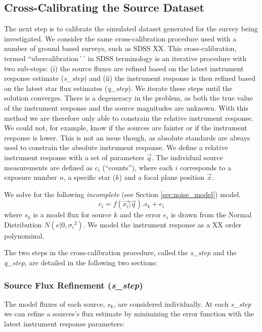\documentclass[manuscript]{aastex}
\begin{document}
\subsection{Cross-Calibrating the Source Dataset}
The next step is to calibrate the simulated dataset generated for the survey being investigated. We consider the same cross-calibration procedure used with a number of ground based surveys, such as SDSS XX. This cross-calibration, termed ``ubercalibration´´ in SDSS terminology is an iterative procedure with two sub-steps: (i) the source fluxes are refined based on the latest instrument response estimate (\textit{s\_step}) and (ii) the instrument response is then refined based on the latest star flux estimates (\textit{q\_step}). We iterate these steps until the solution converges. There is a degeneracy in the problem, as both the true value of the instrument response and the source magnitudes are unknown. With this method we are therefore only able to constrain the relative instrument response. We could not, for example, know if the sources are fainter or if the instrument response is lower. This is not an issue though, as absolute standards are always used to constrain the absolute instrument response. We define a relative instrument response with a set of parameters $\vec{q}$. The individual source measurements are defined as $c_i$ (``counts''), where each $i$ corresponds to a exposure number $n$, a specific star ($k$) and a focal plane position $\vec{x}$.

\noindent{}We solve for the following \textit{incomplete} (see Section \ref{sec:noise_model}) model.
\begin{displaymath}
c_i = f(\vec{x_i} | \vec{q}) . s_{k} + e_{i}
\end{displaymath}
where $s_k$ is a model flux for source $k$ and the error $e_i$ is drawn from the Normal Distribution $N(e|0,{\sigma_i}^2)$. We model the instrument response as a XX order polynominal. 

\noindent{}The two steps in the cross-calibration procedure, called the \textit{s\_step} and the \textit{q\_step}, are detailed in the following two sections:

\subsubsection{Source Flux Refinement (\textit{s\_step})}
The model fluxes of each source, $s_k$, are considered individually. At each \textit{s\_step} we can refine a sources's flux estimate by minimizing the error function with the latest instrument response parameters:
\end{document}
